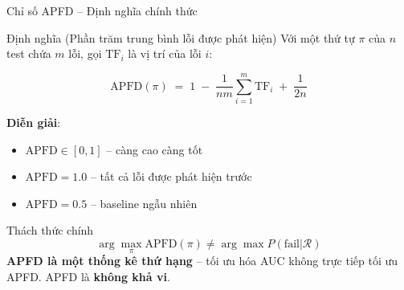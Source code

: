 \documentclass[aspectratio=169,10pt]{beamer}
\begin{document}
\begin{frame}{Chỉ số APFD -- Định nghĩa chính thức}
\vspace{-0.3em}
\begin{block}{Định nghĩa (Phần trăm trung bình lỗi được phát hiện)}
\small
Với một thứ tự $\pi$ của $n$ test chứa $m$ lỗi, gọi $\mathrm{TF}_i$ là vị trí của lỗi $i$:

\[
\boxed{\mathrm{APFD}(\pi) \;=\; 1 \;-\; \frac{1}{nm}\sum_{i=1}^{m} \mathrm{TF}_i \;+\; \frac{1}{2n}}
\]

\textbf{Diễn giải}:
\begin{itemize}\setlength\itemsep{0.1em}
  \item $\mathrm{APFD} \in [0, 1]$ -- càng cao càng tốt
  \item $\mathrm{APFD} = 1.0$ -- tất cả lỗi được phát hiện trước
  \item $\mathrm{APFD} = 0.5$ -- baseline ngẫu nhiên
\end{itemize}
\end{block}

\vspace{0.3em}
\begin{alertblock}{Thách thức chính}
\scriptsize
\[
\arg\max_{\pi} \mathrm{APFD}(\pi) \neq \arg\max P(\text{fail} | \mathcal{R})
\]
\textbf{APFD là một thống kê thứ hạng} -- tối ưu hóa AUC không trực tiếp tối ưu APFD. APFD là \textbf{không khả vi}.
\end{alertblock}
\end{frame}
\end{document}
